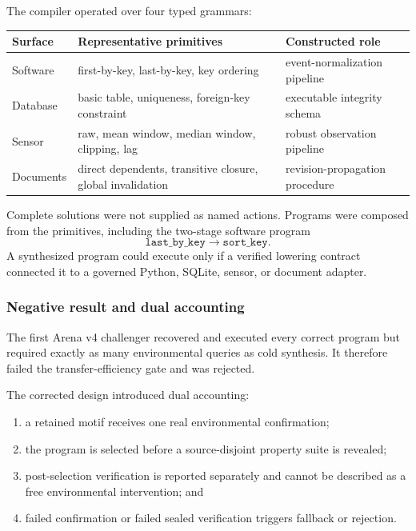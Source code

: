 The compiler operated over four typed grammars:

\begin{center}
\small
\begin{tabular}{|>{\raggedright\arraybackslash}p{2.5cm}|>{\raggedright\arraybackslash}p{5.0cm}|>{\raggedright\arraybackslash}p{4.2cm}|}
\hline
\textbf{Surface} & \textbf{Representative primitives} & \textbf{Constructed role} \\
\hline
Software & first-by-key, last-by-key, key ordering & event-normalization pipeline \\
\hline
Database & basic table, uniqueness, foreign-key constraint & executable integrity schema \\
\hline
Sensor & raw, mean window, median window, clipping, lag & robust observation pipeline \\
\hline
Documents & direct dependents, transitive closure, global invalidation & revision-propagation procedure \\
\hline
\end{tabular}
\end{center}

Complete solutions were not supplied as named actions.  Programs were composed
from the primitives, including the two-stage software program
\begin{equation}
\texttt{last\_by\_key}
\rightarrow
\texttt{sort\_key}.
\label{eq:arena-v4-compound-program}
\end{equation}
A synthesized program could execute only if a verified lowering contract
connected it to a governed Python, SQLite, sensor, or document adapter.


\subsubsection{Negative result and dual accounting}

The first Arena v4 challenger recovered and executed every correct program but
required exactly as many environmental queries as cold synthesis.  It therefore
failed the transfer-efficiency gate and was rejected.

The corrected design introduced dual accounting:
\begin{enumerate}
  \item a retained motif receives one real environmental confirmation;
  \item the program is selected before a source-disjoint property suite is
        revealed;
  \item post-selection verification is reported separately and cannot be
        described as a free environmental intervention; and
  \item failed confirmation or failed sealed verification triggers fallback or
        rejection.
\end{enumerate}

